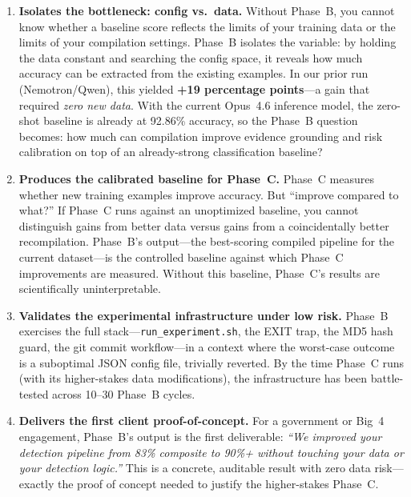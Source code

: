 \documentclass[11pt]{article}
\begin{document}
\begin{enumerate}[leftmargin=2em]
  \item \textbf{Isolates the bottleneck: config vs.\ data.}
  Without Phase~B, you cannot know whether a baseline score reflects the
  limits of your training data or the limits of your compilation settings.
  Phase~B isolates the variable: by holding the data constant and searching
  the config space, it reveals how much accuracy can be extracted from the
  existing examples. In our prior run (Nemotron/Qwen), this yielded
  \textbf{+19 percentage points}---a gain that required \emph{zero new data}.
  With the current Opus~4.6 inference model, the zero-shot baseline is
  already at 92.86\% accuracy, so the Phase~B question becomes: how much
  can compilation improve evidence grounding and risk calibration on top
  of an already-strong classification baseline?

  \item \textbf{Produces the calibrated baseline for Phase~C.}
  Phase~C measures whether new training examples improve accuracy. But
  ``improve compared to what?'' If Phase~C runs against an unoptimized
  baseline, you cannot distinguish gains from better data versus gains
  from a coincidentally better recompilation. Phase~B's output---the
  best-scoring compiled pipeline for the current dataset---is the
  controlled baseline against which Phase~C improvements are measured.
  Without this baseline, Phase~C's results are scientifically
  uninterpretable.

  \item \textbf{Validates the experimental infrastructure under low risk.}
  Phase~B exercises the full stack---\texttt{run\_experiment.sh}, the EXIT
  trap, the MD5 hash guard, the git commit workflow---in a context where
  the worst-case outcome is a suboptimal JSON config file, trivially
  reverted. By the time Phase~C runs (with its higher-stakes data
  modifications), the infrastructure has been battle-tested across
  10--30 Phase~B cycles.

  \item \textbf{Delivers the first client proof-of-concept.}
  For a government or Big~4 engagement, Phase~B's output is the first
  deliverable: \emph{``We improved your detection pipeline from 83\%
  composite to 90\%+ without touching your data or your detection logic.''}
  This is a concrete, auditable result with zero data risk---exactly the
  proof of concept needed to justify the higher-stakes Phase~C.
\end{enumerate}
\end{document}
